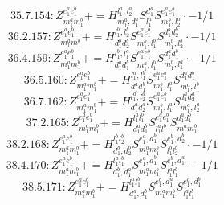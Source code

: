 \documentclass[letterpaper,10pt,fleqn,leqno,onecolumn]{article}
\begin{document}
\begin{equation} \;\;\;\;\;\;  35.7.154: Z^{e_{1}^{a}e_{1}^{b}}_{m_{1}^{a}m_{1}^{b}}+=H^{l_{1}^{a},l_{2}^{a}}_{m_{1}^{a},d_{1}^{a}}S^{d_{1}^{a}}_{l_{1}^{a}}S^{e_{1}^{a}e_{1}^{b}}_{m_{1}^{b},l_{2}^{a}}\cdot -1/1 \end{equation}
\begin{equation} \;\;\;\;\;\;  36.2.157: Z^{e_{1}^{a}e_{1}^{b}}_{m_{1}^{a}m_{1}^{b}}+=H^{l_{1}^{b},l_{2}^{b}}_{d_{1}^{b}d_{2}^{b}}S^{e_{1}^{a}e_{1}^{b}}_{m_{1}^{a},l_{1}^{b}}S^{d_{1}^{b}d_{2}^{b}}_{m_{1}^{b},l_{2}^{b}}\cdot -1/1 \end{equation}
\begin{equation} \;\;\;\;\;\;  36.4.159: Z^{e_{1}^{a}e_{1}^{b}}_{m_{1}^{a}m_{1}^{b}}+=H^{l_{1}^{b},l_{1}^{a}}_{d_{1}^{a}d_{1}^{b}}S^{e_{1}^{a}e_{1}^{b}}_{m_{1}^{a},l_{1}^{b}}S^{d_{1}^{a}d_{1}^{b}}_{m_{1}^{b},l_{1}^{a}}\cdot -1/1 \end{equation}
\begin{equation} \;\;\;\;\;\;  36.5.160: Z^{e_{1}^{a}e_{1}^{b}}_{m_{1}^{a}m_{1}^{b}}+=H^{l_{1}^{a},l_{1}^{b}}_{d_{1}^{a}d_{1}^{b}}S^{e_{1}^{a}e_{1}^{b}}_{m_{1}^{b},l_{1}^{a}}S^{d_{1}^{a}d_{1}^{b}}_{m_{1}^{a},l_{1}^{b}} \end{equation}
\begin{equation} \;\;\;\;\;\;  36.7.162: Z^{e_{1}^{a}e_{1}^{b}}_{m_{1}^{a}m_{1}^{b}}+=H^{l_{1}^{a},l_{2}^{a}}_{d_{1}^{a}d_{2}^{a}}S^{e_{1}^{a}e_{1}^{b}}_{m_{1}^{b},l_{1}^{a}}S^{d_{1}^{a}d_{2}^{a}}_{m_{1}^{a},l_{2}^{a}} \end{equation}
\begin{equation} \;\;\;\;\;\;  37.2.165: Z^{e_{1}^{a}e_{1}^{b}}_{m_{1}^{a}m_{1}^{b}}+=H^{l_{1}^{a}l_{1}^{b}}_{d_{1}^{a}d_{1}^{b}}S^{e_{1}^{a}e_{1}^{b}}_{l_{1}^{a}l_{1}^{b}}S^{d_{1}^{a}d_{1}^{b}}_{m_{1}^{a}m_{1}^{b}} \end{equation}
\begin{equation} \;\;\;\;\;\;  38.2.168: Z^{e_{1}^{a}e_{1}^{b}}_{m_{1}^{a}m_{1}^{b}}+=H^{l_{1}^{b}l_{2}^{b}}_{d_{1}^{b},d_{2}^{b}}S^{e_{1}^{a},d_{1}^{b}}_{m_{1}^{a}m_{1}^{b}}S^{e_{1}^{b},d_{2}^{b}}_{l_{1}^{b}l_{2}^{b}}\cdot -1/1 \end{equation}
\begin{equation} \;\;\;\;\;\;  38.4.170: Z^{e_{1}^{a}e_{1}^{b}}_{m_{1}^{a}m_{1}^{b}}+=H^{l_{1}^{a}l_{1}^{b}}_{d_{1}^{b},d_{1}^{a}}S^{e_{1}^{a},d_{1}^{b}}_{m_{1}^{a}m_{1}^{b}}S^{e_{1}^{b},d_{1}^{a}}_{l_{1}^{a}l_{1}^{b}}\cdot -1/1 \end{equation}
\begin{equation} \;\;\;\;\;\;  38.5.171: Z^{e_{1}^{a}e_{1}^{b}}_{m_{1}^{a}m_{1}^{b}}+=H^{l_{1}^{a}l_{1}^{b}}_{d_{1}^{a},d_{1}^{b}}S^{e_{1}^{b},d_{1}^{a}}_{m_{1}^{a}m_{1}^{b}}S^{e_{1}^{a},d_{1}^{b}}_{l_{1}^{a}l_{1}^{b}} \end{equation}
\end{document}
